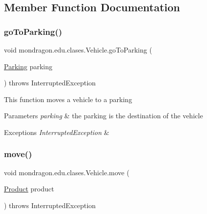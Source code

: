 \subsection{Member Function Documentation}
\mbox{\label{classmondragon_1_1edu_1_1clases_1_1_vehicle_a25806b71f37b2004f3209d4b63a432ce}} 
\subsubsection{\texorpdfstring{goToParking()}{goToParking()}}
{\footnotesize\ttfamily void mondragon.\+edu.\+clases.\+Vehicle.\+go\+To\+Parking (\begin{DoxyParamCaption}\item[{\mbox{\hyperlink{classmondragon_1_1edu_1_1clases_1_1_parking}{Parking}}}]{parking }\end{DoxyParamCaption}) throws Interrupted\+Exception\hspace{0.3cm}{\ttfamily [inline]}}

This function moves a vehicle to a parking


\begin{DoxyParams}{Parameters}
{\em parking} & the parking is the destination of the vehicle \\
\hline
\end{DoxyParams}

\begin{DoxyExceptions}{Exceptions}
{\em Interrupted\+Exception} & \\
\hline
\end{DoxyExceptions}
\mbox{\label{classmondragon_1_1edu_1_1clases_1_1_vehicle_a70ac1c7c2a0cc9e5bfe1ccd0b2e89ed5}} 
\subsubsection{\texorpdfstring{move()}{move()}}
{\footnotesize\ttfamily void mondragon.\+edu.\+clases.\+Vehicle.\+move (\begin{DoxyParamCaption}\item[{\mbox{\hyperlink{classmondragon_1_1edu_1_1clases_1_1_product}{Product}}}]{product }\end{DoxyParamCaption}) throws Interrupted\+Exception\hspace{0.3cm}{\ttfamily [inline]}}

